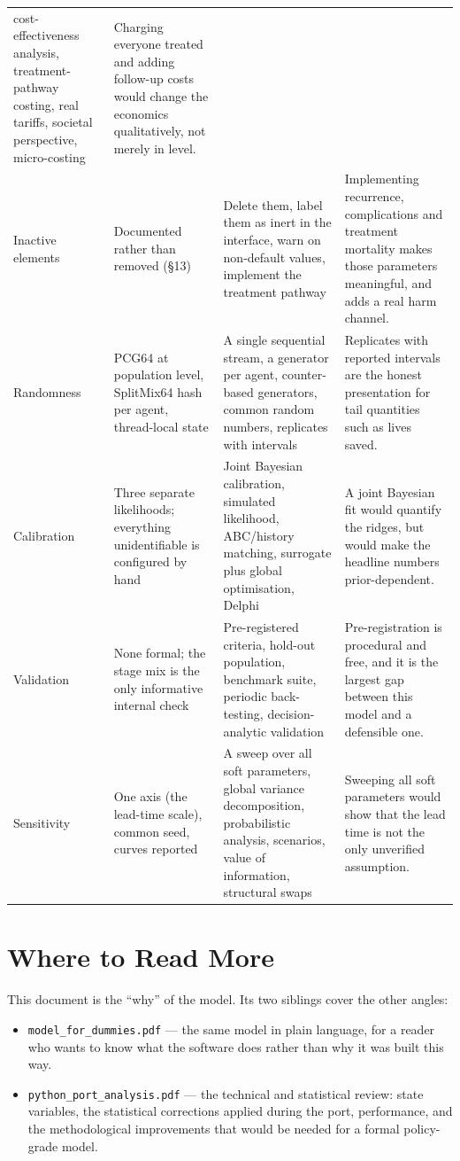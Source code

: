 \documentclass[12pt,a4paper]{article}
\newcommand{\id}[1]{\texttt{#1}}
\begin{document}
{\begin{longtable}{@{}p{2.3cm}p{4.5cm}p{4.0cm}p{4.0cm}@{}}
cost-effectiveness analysis, treatment-pathway costing, real tariffs, societal perspective, micro-costing &
Charging everyone treated and adding follow-up costs would change the economics qualitatively, not merely in
level. \\
Inactive elements & Documented rather than removed (\S13) & Delete them, label them as inert in the interface,
warn on non-default values, implement the treatment pathway & Implementing recurrence, complications and
treatment mortality makes those parameters meaningful, and adds a real harm channel. \\
Randomness & PCG64 at population level, SplitMix64 hash per agent, thread-local state & A single sequential
stream, a generator per agent, counter-based generators, common random numbers, replicates with intervals &
Replicates with reported intervals are the honest presentation for tail quantities such as lives saved. \\
Calibration & Three separate likelihoods; everything unidentifiable is configured by hand & Joint Bayesian
calibration, simulated likelihood, ABC/history matching, surrogate plus global optimisation, Delphi &
A joint Bayesian fit would quantify the ridges, but would make the headline numbers prior-dependent. \\
Validation & None formal; the stage mix is the only informative internal check & Pre-registered criteria,
hold-out population, benchmark suite, periodic back-testing, decision-analytic validation & Pre-registration
is procedural and free, and it is the largest gap between this model and a defensible one. \\
Sensitivity & One axis (the lead-time scale), common seed, curves reported & A sweep over all soft
parameters, global variance decomposition, probabilistic analysis, scenarios, value of information,
structural swaps & Sweeping all soft parameters would show that the lead time is not the only unverified
assumption. \\
\end{longtable}
}

\section{Where to Read More}

This document is the ``why'' of the model. Its two siblings cover the other angles:

\begin{itemize}[nosep]
  \item \id{model\_for\_dummies.pdf} --- the same model in plain language, for a reader who wants to know
        what the software does rather than why it was built this way.
  \item \id{python\_port\_analysis.pdf} --- the technical and statistical review: state variables, the
        statistical corrections applied during the port, performance, and the methodological improvements
        that would be needed for a formal policy-grade model.
\end{itemize}
\end{document}
